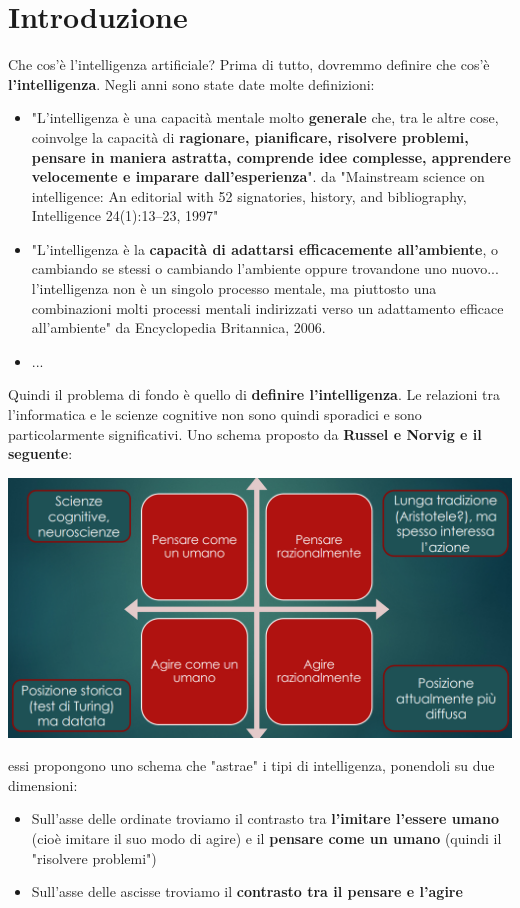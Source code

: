 \documentclass[12pt]{article}
\begin{document}
\section{Introduzione}
Che cos'è l'intelligenza artificiale? Prima di tutto, dovremmo definire che cos'è \textbf{l'intelligenza}.
Negli anni sono state date molte definizioni:
\begin{itemize}
    \item "L'intelligenza è una capacità mentale molto \textbf{generale} che, tra le altre cose, coinvolge la capacità di \textbf{ragionare, pianificare, risolvere problemi, pensare in maniera astratta, comprende idee complesse, apprendere velocemente e imparare dall'esperienza}".
     da "Mainstream science on intelligence: An editorial with 52 signatories, history,
        and bibliography, Intelligence 24(1):13–23, 1997"
    \item "L'intelligenza è la \textbf{capacità di adattarsi efficacemente all'ambiente}, o cambiando se stessi o cambiando l'ambiente oppure trovandone uno nuovo... l'intelligenza non è un singolo processo mentale, ma piuttosto una combinazioni molti processi mentali indirizzati verso un adattamento efficace all'ambiente" da Encyclopedia Britannica, 2006.
    \item ... 
\end{itemize}
Quindi il problema di fondo è quello di \textbf{definire l'intelligenza}. Le relazioni tra l'informatica e le scienze cognitive non sono quindi
sporadici e sono particolarmente significativi. Uno schema proposto da \textbf{Russel e Norvig e il seguente}:
\begin{center}
    \includegraphics[width = 1\linewidth]{Images/1.PNG}
\end{center}
essi propongono uno schema che "astrae" i tipi di intelligenza, ponendoli su due dimensioni:
\begin{itemize}
    \item Sull'asse delle ordinate troviamo il contrasto tra \textbf{l'imitare l'essere umano} (cioè imitare il suo modo di agire) e il \textbf{pensare come un umano} (quindi il "risolvere problemi")
    \item Sull'asse delle ascisse troviamo il \textbf{contrasto tra il pensare e l'agire}
\end{itemize}
\end{document}
